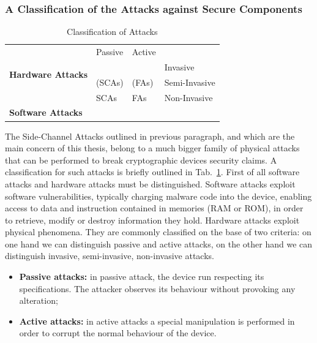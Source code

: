 \subsubsection{A Classification of the Attacks against Secure Components}\label{sec:classification_attacks}
\begin{table}[]
\centering
\caption{Classification of Attacks}
\label{fig:classification_attacks}
\begin{tabular}{|l|lll}
\cline{1-3}
\multirow{4}{*}{\textbf{Hardware Attacks}} & \multicolumn{1}{l|}{Passive} & \multicolumn{1}{l|}{Active} &                                    \\ \cline{2-4} 
                                           & \multicolumn{1}{l|}{}        & \multicolumn{1}{l|}{}       & \multicolumn{1}{l|}{Invasive}      \\ \cline{2-4} 
                                           & \multicolumn{1}{l|}{(SCAs)}        & \multicolumn{1}{l|}{(FAs)}       & \multicolumn{1}{l|}{Semi-Invasive} \\ \cline{2-4} 
                                           & \multicolumn{1}{l|}{SCAs}    & \multicolumn{1}{l|}{FAs}    & \multicolumn{1}{l|}{Non-Invasive}  \\ \hline
\textbf{Software Attacks}                  &                              &                             &                                    \\ \cline{1-1}
\end{tabular}
\end{table}

The Side-Channel Attacks outlined in previous paragraph, and which are the main concern of this thesis,  belong to a much bigger family of physical attacks that can be performed to break cryptographic devices security claims. A classification for such attacks is briefly outlined in Tab.~\ref{fig:classification_attacks}. First of all software attacks and hardware attacks must be distinguished. Software attacks exploit software vulnerabilities, typically charging malware code into the device, enabling access to data and instruction contained in memories (RAM or ROM), in order to retrieve, modify or destroy information they hold. Hardware attacks exploit physical phenomena. They are commonly classified on the base of two criteria: on one hand we can distinguish passive and active attacks, on the other hand we can distinguish invasive, semi-invasive, non-invasive attacks. 
\begin{itemize}
\item[] \textbf{Passive attacks:} in passive attack, the device run respecting its specifications. The attacker observes its behaviour without provoking any alteration;
\item[] \textbf{Active attacks:}  in active attacks a special manipulation is performed in order to corrupt the normal behaviour of the device. 
\end{itemize}


